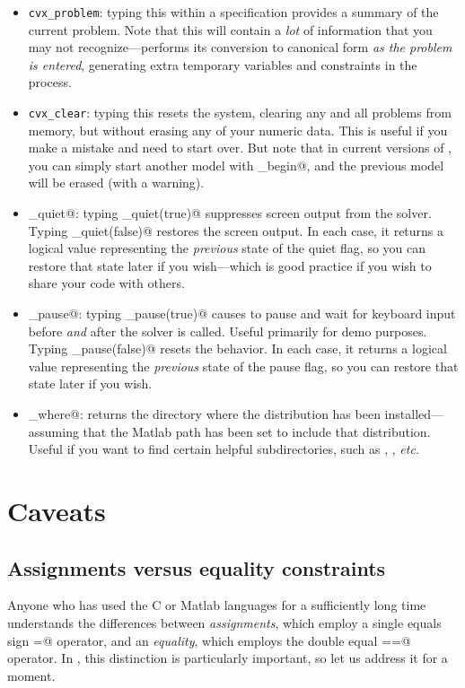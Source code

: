\documentclass[12pt]{article}
\begin{document}
\begin{itemize}
\item \verb+cvx_problem+: typing this within a \cvx specification provides a summary
of the current problem. Note that this will contain a \emph{lot} of information
that you may not recognize---\cvx performs its conversion to canonical form
\emph{as the problem is entered}, generating extra temporary variables and
constraints in the process.
\item \verb+cvx_clear+: typing this resets the \cvx system, clearing any and all problems
from memory, but without erasing any of your numeric data.
This is useful if you make a mistake and need to start over. But note that in current
versions of \cvx, you can simply start another model with \verb@cvx_begin@, and
the previous model will be erased (with a warning).
\item \verb@cvx_quiet@: typing \verb@cvx_quiet(true)@ suppresses screen
output from the solver. Typing \verb@cvx_quiet(false)@ restores the screen
output. In each case, it returns a logical value representing the \emph{previous}
state of the quiet flag, so you can restore that state later if you wish---which
is good practice if you wish to share your code with others.
\item \verb@cvx_pause@: typing \verb@cvx_pause(true)@ causes \cvx to pause and
wait for keyboard input before \emph{and} after the solver is called. Useful
primarily for demo purposes. Typing \verb@cvx_pause(false)@ resets the behavior.
In each case, it returns a logical value representing the \emph{previous} state
of the pause flag, so you can restore that state later if you wish.
\item \verb@cvx_where@: returns the directory where the \cvx distribution
has been installed---assuming that the Matlab path has been set to include
that distribution. Useful if you want to find certain helpful subdirectories,
such as \verb@doc@, \verb@examples@, \emph{etc.}
\end{itemize}

\section{Caveats}

\subsection{Assignments versus equality constraints}
\label{sec:eqass}

Anyone who has used the C or Matlab languages for a sufficiently long time
understands the differences between \emph{assignments}, which employ a single
equals sign \verb@=@ operator, and an \emph{equality}, which employs the
double equal \verb@==@ operator. In \cvx, this distinction is particularly
important, so let us address it for a moment.
\end{document}
